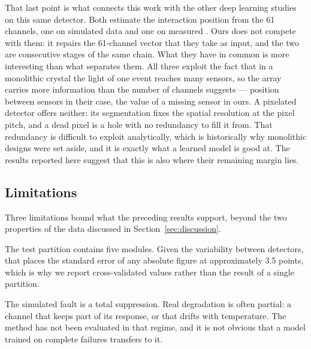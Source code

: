 \documentclass[10pt,conference]{IEEEtran}
\begin{document}
That last point is what connects this work with the other deep learning studies
on this same detector. Both estimate the interaction position from the 61
channels, one on simulated data \cite{jimenez2025} and one on measured
\cite{hidalgo2022, hidalgo-torres_predicting_2020}. Ours does not compete with
them: it repairs the 61-channel vector that they take as input, and the two are
consecutive stages of the same chain. What they have in common is more
interesting than what separates them. All three exploit the fact that in a
monolithic crystal the light of one event reaches many sensors, so the array
carries more information than the number of channels suggests --- position
between sensors in their case, the value of a missing sensor in ours. A
pixelated detector offers neither: its segmentation fixes the spatial
resolution at the pixel pitch, and a dead pixel is a hole with no redundancy to
fill it from. That redundancy is difficult to exploit analytically, which is
historically why monolithic designs were set aside, and it is exactly what a
learned model is good at. The results reported here suggest that this is also
where their remaining margin lies.

\subsection{Limitations}

Three limitations bound what the preceding results support, beyond the two
properties of the data discussed in Section~\ref{sec:discussion}.

The test partition contains five modules. Given the variability between
detectors, that places the standard error of any absolute figure at
approximately 3.5 points, which is why we report cross-validated values rather
than the result of a single partition.

The simulated fault is a total suppression. Real degradation is often partial:
a channel that keeps part of its response, or that drifts with temperature. The
method has not been evaluated in that regime, and it is not obvious that a
model trained on complete failures transfers to it.
\end{document}
